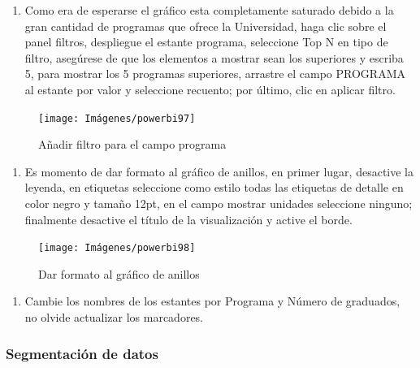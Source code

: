 \documentclass[
]{book}
\providecommand{\tightlist}{%
  \setlength{\itemsep}{0pt}\setlength{\parskip}{0pt}}
\begin{document}
\begin{enumerate}
\def\labelenumi{\arabic{enumi}.}
\setcounter{enumi}{2}
\tightlist
\item
  Como era de esperarse el gráfico esta completamente saturado debido a la gran cantidad de programas que ofrece la Universidad, haga clic sobre el panel filtros, despliegue el estante programa, seleccione Top N en tipo de filtro, asegúrese de que los elementos a mostrar sean los superiores y escriba 5, para mostrar los 5 programas superiores, arrastre el campo PROGRAMA al estante por valor y seleccione recuento; por último, clic en aplicar filtro.
\end{enumerate}

\begin{figure}

{\centering \texttt{[image: Imágenes/powerbi97]} 

}

\caption{Añadir filtro para el campo programa}\label{fig:paso3anillos-fig}
\end{figure}

\begin{enumerate}
\def\labelenumi{\arabic{enumi}.}
\setcounter{enumi}{3}
\tightlist
\item
  Es momento de dar formato al gráfico de anillos, en primer lugar, desactive la leyenda, en etiquetas seleccione como estilo todas las etiquetas de detalle en color negro y tamaño 12pt, en el campo mostrar unidades seleccione ninguno; finalmente desactive el título de la visualización y active el borde.
\end{enumerate}

\begin{figure}

{\centering \texttt{[image: Imágenes/powerbi98]} 

}

\caption{Dar formato al gráfico de anillos}\label{fig:paso4anillos-fig}
\end{figure}

\begin{enumerate}
\def\labelenumi{\arabic{enumi}.}
\setcounter{enumi}{4}
\tightlist
\item
  Cambie los nombres de los estantes por Programa y Número de graduados, no olvide actualizar los marcadores.
\end{enumerate}

\hypertarget{segementaciondatospowerbi}{%
\subsubsection{Segmentación de datos}\label{segementaciondatospowerbi}}
\end{document}
